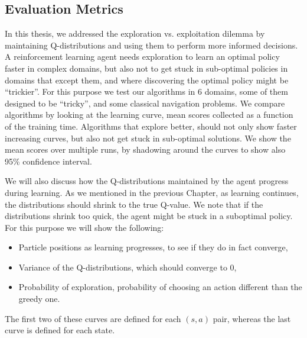 \subsection{Evaluation Metrics}
In this thesis, we addressed the exploration vs. exploitation dilemma by maintaining Q-distributions and using them to perform more informed decisions. A reinforcement learning agent needs exploration to learn an optimal policy faster in complex domains, but also not to get stuck in sub-optimal policies in domains that except them, and where discovering the optimal policy might be ``trickier''. For this purpose we test our algorithms in 6 domains, some of them designed to be ``tricky'', and some classical navigation problems. We compare algorithms by looking at the learning curve, \ie mean scores collected as a function of the training time. Algorithms that explore better, should not only show faster increasing curves, but also not get stuck in sub-optimal solutions. We show the mean scores over multiple runs, by shadowing around the curves to show also 95\% confidence interval.\par
We will also discuss how the Q-distributions maintained by the agent progress during learning. As we mentioned in the previous Chapter, as learning continues, the distributions should shrink to the true Q-value. We note that if the distributions shrink too quick, the agent might be stuck in a suboptimal policy. For this purpose we will show the following:
\begin{itemize}
\item Particle positions as learning progresses, to see if they do in fact converge,
\item Variance of the Q-distributions, which should converge to 0,
\item Probability of exploration, \ie probability of choosing an action different than the greedy one.
\end{itemize}
The first two of these curves are defined for each $(s,a)$ pair, whereas the last curve is defined for each state.
